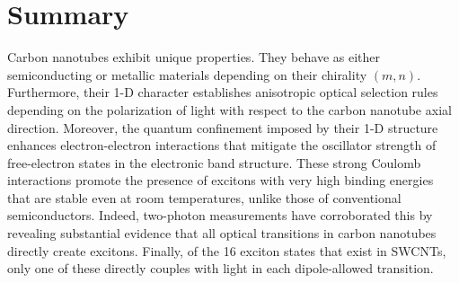 \section{Summary}

Carbon nanotubes exhibit unique properties. They behave as either semiconducting or metallic materials depending on their chirality $(m,n)$. Furthermore, their 1-D character establishes anisotropic optical selection rules depending on the polarization of light with respect to the carbon nanotube axial direction. Moreover, the quantum confinement imposed by their 1-D structure enhances electron-electron interactions that mitigate the oscillator strength of free-electron states in the electronic band structure. These strong Coulomb interactions promote the presence of excitons with very high binding energies that are stable even at room temperatures, unlike those of conventional semiconductors. Indeed, two-photon measurements have corroborated this by revealing substantial evidence that all optical transitions in carbon nanotubes directly create excitons. Finally, of the 16 exciton states that exist in SWCNTs, only one of these directly couples with light in each dipole-allowed transition.
